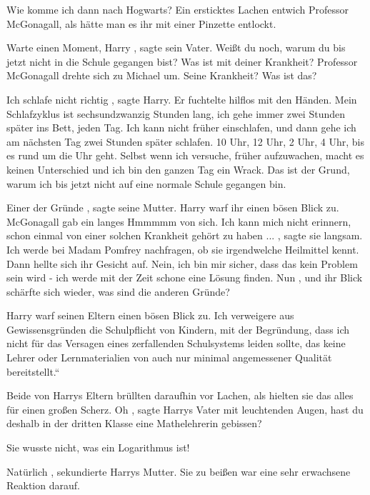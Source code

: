 \glqq Wie komme ich dann nach Hogwarts?\grqq{} Ein ersticktes Lachen entwich
Professor McGonagall, als hätte man es ihr mit einer Pinzette entlockt.

\glqq Warte einen Moment, Harry\grqq{} , sagte sein Vater. \glqq Weißt du noch, warum
du bis jetzt nicht in die Schule gegangen bist? Was ist mit deiner
Krankheit?\grqq{} Professor McGonagall drehte sich zu Michael um. \glqq Seine
Krankheit? Was ist das?\grqq{}

\glqq Ich schlafe nicht richtig\grqq{} , sagte Harry. Er fuchtelte hilflos mit den
Händen. \glqq Mein Schlafzyklus ist sechsundzwanzig Stunden lang, ich gehe immer
zwei Stunden später ins Bett, jeden Tag. Ich kann nicht früher einschlafen, und
dann gehe ich am nächsten Tag zwei Stunden später schlafen. 10 Uhr, 12 Uhr, 2
Uhr, 4 Uhr, bis es rund um die Uhr geht. Selbst wenn ich versuche, früher
aufzuwachen, macht es keinen Unterschied und ich bin den ganzen Tag ein Wrack.
Das ist der Grund, warum ich bis jetzt nicht auf eine normale Schule gegangen
bin.\grqq{}

\glqq Einer der Gründe\grqq{} , sagte seine Mutter. Harry warf ihr einen bösen Blick
zu. McGonagall gab ein langes Hmmmmm von sich. \glqq Ich kann mich nicht
erinnern, schon einmal von einer solchen Krankheit gehört zu haben ...\grqq{} , sagte
sie langsam. \glqq Ich werde bei Madam Pomfrey nachfragen, ob sie irgendwelche
Heilmittel kennt.\grqq{} Dann hellte sich ihr Gesicht auf. \glqq Nein, ich bin
mir sicher, dass das kein Problem sein wird - ich werde mit der Zeit schone eine
Lösung finden. Nun\grqq{} , und ihr Blick schärfte sich wieder, \glqq was sind die
anderen Gründe?\grqq{}

Harry warf seinen Eltern einen bösen Blick zu. \glqq Ich verweigere aus
Gewissensgründen die Schulpflicht von Kindern, mit der Begründung, dass ich
nicht für das Versagen eines zerfallenden Schulsystems leiden sollte, das keine
Lehrer oder Lernmaterialien von auch nur minimal angemessener Qualität
bereitstellt.“

Beide von Harrys Eltern brüllten daraufhin vor Lachen, als hielten sie das alles
für einen großen Scherz. \glqq Oh\grqq{} , sagte Harrys Vater mit leuchtenden Augen,
\glqq hast du deshalb in der dritten Klasse eine Mathelehrerin gebissen?\grqq{}

\glqq Sie wusste nicht, was ein Logarithmus ist! \glqq

\glqq Natürlich\grqq{} , sekundierte Harrys Mutter. \glqq Sie zu beißen war eine sehr
erwachsene Reaktion darauf.\grqq{}

